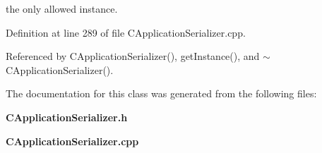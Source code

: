 the only allowed instance.



Definition at line 289 of file CApplication\-Serializer.cpp.

Referenced by CApplication\-Serializer(), get\-Instance(), and $\sim$CApplication\-Serializer().

The documentation for this class was generated from the following files:\begin{CompactItemize}
\item 
{\bf CApplication\-Serializer.h}\item 
{\bf CApplication\-Serializer.cpp}\end{CompactItemize}
